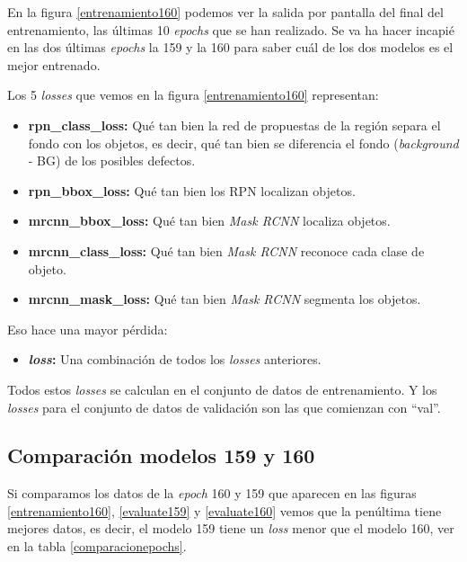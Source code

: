En la figura \ref{entrenamiento160} podemos ver la salida por pantalla del final del entrenamiento, las últimas 10 \textit{epochs} que se han realizado. Se va ha hacer incapié en las dos últimas \textit{epochs} la 159 y la 160 para saber cuál de los dos modelos es el mejor entrenado.

Los 5 \textit{losses} que vemos en la figura \ref{entrenamiento160} representan\label{losses}:

\begin{itemize}
    \item \textbf{rpn\_class\_loss:} Qué tan bien la red de propuestas de la región separa el fondo con los objetos, es decir, qué tan bien se diferencia el fondo (\textit{background} - BG) de los posibles defectos.
    \item \textbf{rpn\_bbox\_loss:} Qué tan bien los RPN localizan objetos.
    \item \textbf{mrcnn\_bbox\_loss:} Qué tan bien \textit{Mask RCNN} localiza objetos.
    \item \textbf{mrcnn\_class\_loss:} Qué tan bien \textit{Mask RCNN} reconoce cada clase de objeto.
    \item \textbf{mrcnn\_mask\_loss:} Qué tan bien \textit{Mask RCNN} segmenta los objetos.
\end{itemize}

Eso hace una mayor pérdida:

\begin{itemize}
    \item \textbf{\textit{loss}:} Una combinación de todos los \textit{losses} anteriores.
\end{itemize}

Todos estos \textit{losses} se calculan en el conjunto de datos de entrenamiento. Y los \textit{losses} para el conjunto de datos de validación son las que comienzan con ``val''.

\newpage

\subsection{Comparación modelos 159 y 160\label{SectionComparacion}}



Si comparamos los datos de la \textit{epoch} 160 y 159 que aparecen en las figuras \ref{entrenamiento160}, \ref{evaluate159} y \ref{evaluate160} vemos que la penúltima tiene mejores datos, es decir, el modelo 159 tiene un \textit{loss} menor que el modelo 160, ver en la tabla \ref{comparacionepochs}.

